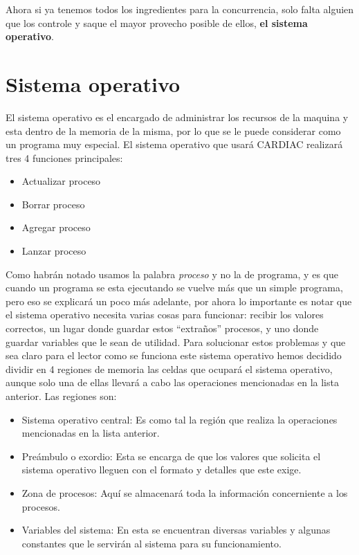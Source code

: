 \documentclass[12pt]{article}
\begin{document}
	Ahora si ya tenemos todos los ingredientes para la concurrencia, solo falta alguien que los controle y saque el mayor provecho
	posible de ellos, \textbf{el sistema operativo}.
	
	
	\section{ Sistema operativo}
	
	El sistema operativo es el encargado de administrar los recursos de la maquina y esta dentro de la memoria de la misma, por lo
	que se le puede considerar como un programa muy especial. El sistema operativo que usará CARDIAC realizará tres 4 funciones
	principales:
	
	\begin{itemize}
		\item Actualizar proceso
		\item Borrar proceso
		\item Agregar proceso
		\item Lanzar proceso
	\end{itemize}
	
	Como habrán notado usamos la palabra \textit{proceso} y no la de programa, y es que cuando un programa se esta ejecutando
	se vuelve más que un simple programa, pero eso se explicará un poco más adelante, por ahora lo importante es notar que
	el sistema operativo necesita varias cosas para funcionar: recibir los valores correctos, un lugar donde
	guardar estos ``extraños'' procesos, y uno donde guardar variables que le sean de utilidad. Para solucionar estos
	problemas y que sea claro para el lector como se funciona este sistema operativo
	hemos decidido dividir en 4 regiones de memoria las celdas que ocupará el
	sistema operativo, aunque solo una de ellas llevará a cabo las operaciones mencionadas en la lista anterior. Las regiones
	son:
	
	\begin{itemize}
		\item Sistema operativo central: Es como tal la región que realiza la operaciones mencionadas en la lista anterior.
		\item Preámbulo o exordio: Esta se encarga de que los valores que solicita el sistema operativo lleguen con el
		formato y detalles que este exige.
		\item Zona de procesos: Aquí se almacenará toda la información concerniente a los procesos.
		\item Variables del sistema: En esta se encuentran diversas variables y algunas constantes que le servirán al sistema
		para su funcionamiento.
	\end{itemize}
	
\end{document}
